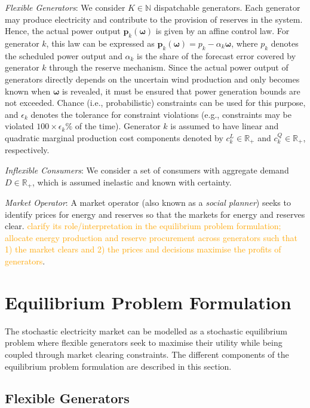 \documentclass{article}
\begin{document}
\textit{Flexible Generators}: We consider $K \in \mathbb{N}$ dispatchable generators. Each generator may produce electricity and contribute to the provision of reserves in the system. Hence, the actual power output $\mathbf{p}_k(\boldsymbol{\omega})$ is given by an affine control law. For generator $k$, this law can be expressed as $\mathbf{p}_k(\boldsymbol{\omega}) = p_k - \alpha_k \boldsymbol{\omega}$, where $p_k$ denotes the scheduled power output and $\alpha_k$ is the share of the forecast error covered by generator $k$ through the reserve mechanism. Since the actual power output of generators directly depends on the uncertain wind production and only becomes known when $\boldsymbol{\omega}$ is revealed, it must be ensured that power generation bounds are not exceeded. Chance (i.e., probabilistic) constraints can be used for this purpose, and $\epsilon_k$ denotes the tolerance for constraint violations (e.g., constraints may be violated $100 \times \epsilon_k \%$ of the time). Generator $k$ is assumed to have linear and quadratic marginal production cost components denoted by $c_k^L \in \mathbb{R}_+$ and $c_k^Q \in \mathbb{R}_+$, respectively.

\textit{Inflexible Consumers}: We consider a set of consumers with aggregate demand $D \in \mathbb{R}_+$, which is assumed inelastic and known with certainty.

\textit{Market Operator}: A market operator (also known as a \textit{social planner}) seeks to identify prices for energy and reserves so that the markets for energy and reserves clear. \textcolor{orange}{clarify its role/interpretation in the equilibrium problem formulation; allocate energy production and reserve procurement across generators such that 1) the market clears and 2) the prices and decisions maximise the profits of generators}. 

\section{Equilibrium Problem Formulation}

The stochastic electricity market can be modelled as a stochastic equilibrium problem where flexible generators seek to maximise their utility while being coupled through market clearing constraints. The different components of the equilibrium problem formulation are described in this section. 

\subsection{Flexible Generators}
\end{document}

